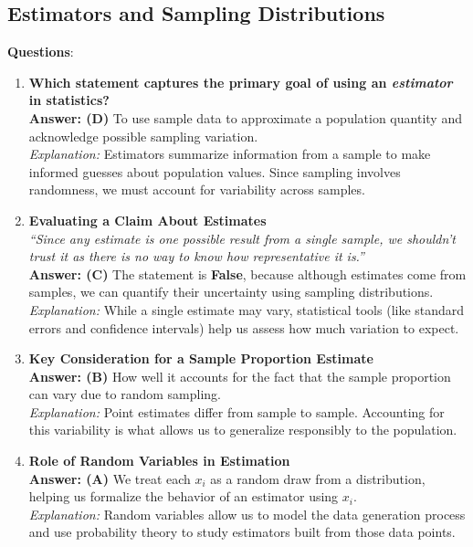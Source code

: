 \documentclass{article}
\begin{document}
\subsection{Estimators and Sampling Distributions}


\textbf{Questions}:

\begin{enumerate}
  \item \textbf{Which statement captures the primary goal of using an \emph{estimator} in statistics?} \\
  \textbf{Answer: (D)} To use sample data to approximate a population quantity and acknowledge possible sampling variation.\\
  \textit{Explanation:} Estimators summarize information from a sample to make informed guesses about population values. Since sampling involves randomness, we must account for variability across samples.

  \item \textbf{Evaluating a Claim About Estimates} \\
  \emph{“Since any estimate is one possible result from a single sample, we shouldn’t trust it as there is no way to know how representative it is.”} \\
  \textbf{Answer: (C)} The statement is \textbf{False}, because although estimates come from samples, we can quantify their uncertainty using sampling distributions.\\
  \textit{Explanation:} While a single estimate may vary, statistical tools (like standard errors and confidence intervals) help us assess how much variation to expect.

  \item \textbf{Key Consideration for a Sample Proportion Estimate} \\
  \textbf{Answer: (B)} How well it accounts for the fact that the sample proportion can vary due to random sampling.\\
  \textit{Explanation:} Point estimates differ from sample to sample. Accounting for this variability is what allows us to generalize responsibly to the population.

  \item \textbf{Role of Random Variables in Estimation} \\
  \textbf{Answer: (A)} We treat each $x_i$ as a random draw from a distribution, helping us formalize the behavior of an estimator using $x_i$.\\
  \textit{Explanation:} Random variables allow us to model the data generation process and use probability theory to study estimators built from those data points.


\end{enumerate}
\end{document}
